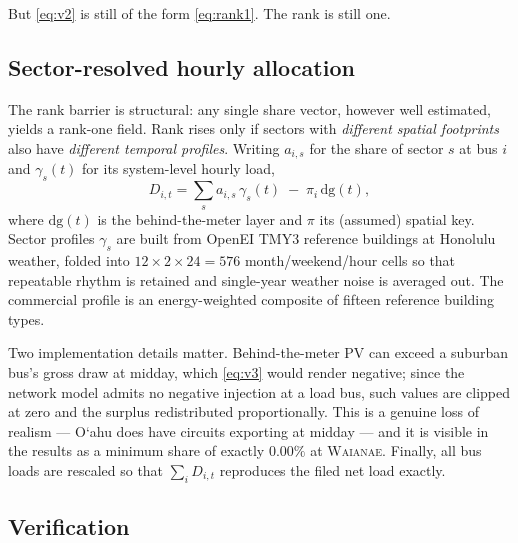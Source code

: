 \documentclass[11pt,a4paper]{article}
\theoremstyle{definition}
\theoremstyle{plain}
\theoremstyle{remark}
\newcommand{\okina}{\textquoteleft}
\newcommand{\Oahu}{O\okina ahu}
\begin{document}
But \eqref{eq:v2} is still of the form \eqref{eq:rank1}. The rank is still one.

\subsection{Sector-resolved hourly allocation}
\label{sec:v3}

The rank barrier is structural: any single share vector, however well
estimated, yields a rank-one field. Rank rises only if sectors with
\emph{different spatial footprints} also have \emph{different temporal
profiles}. Writing $a_{i,s}$ for the share of sector $s$ at bus $i$ and
$\gamma_s(t)$ for its system-level hourly load,
\begin{equation}
  D_{i,t} = \sum_{s} a_{i,s}\,\gamma_s(t) \;-\; \pi_i\, \mathrm{dg}(t),
\label{eq:v3}
\end{equation}
where $\mathrm{dg}(t)$ is the behind-the-meter layer and $\pi$ its (assumed)
spatial key. Sector profiles $\gamma_s$ are built from OpenEI TMY3 reference
buildings at Honolulu weather, folded into $12 \times 2 \times 24 = 576$
month/weekend/hour cells so that repeatable rhythm is retained and single-year
weather noise is averaged out. The commercial profile is an energy-weighted
composite of fifteen reference building types.

Two implementation details matter. Behind-the-meter PV can exceed a suburban
bus's gross draw at midday, which \eqref{eq:v3} would render negative; since the
network model admits no negative injection at a load bus, such values are
clipped at zero and the surplus redistributed proportionally. This is a genuine
loss of realism --- \Oahu{} does have circuits exporting at midday --- and it is
visible in the results as a minimum share of exactly $0.00\%$ at
\textsc{Waianae}. Finally, all bus loads are rescaled so that
$\sum_i D_{i,t}$ reproduces the filed net load exactly.

\subsection{Verification}
\end{document}
